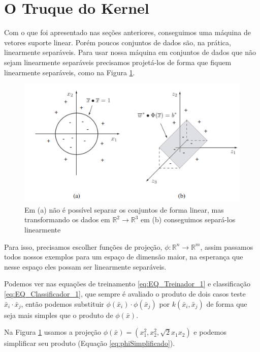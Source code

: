 \section{O Truque do Kernel}
Com o que foi apresentado nas seções anteriores, conseguimos uma máquina de vetores suporte linear. Porém poucos conjuntos de dados são, na prática, linearmente separáveis. Para usar nossa máquina em conjuntos de dados que não sejam linearmente separáveis precisamos projetá-los de forma que fiquem linearmente separáveis, como na Figura \ref{fig:LABEL_FIG_5}.

\begin{figure}
  \centering
  \includegraphics[width=1\textwidth]{imagens/svm_5.png}
  \caption{Em (a) não é possível separar os conjuntos de forma linear, mas transformando os dados em $\mathbb{R}^2\rightarrow \mathbb{R}^3$ em (b) conseguimos separá-los linearmente \cite{art:LIVRO_SVM}}
  \label{fig:LABEL_FIG_5}
\end{figure}

Para isso, precisamos escolher funções de projeção, $\phi:\mathbb{R}^n\rightarrow\mathbb{R}^m$, assim passamos todos nossos exemplos para um espaço de dimensão maior, na esperança que nesse espaço eles possam ser linearmente separáveis.

Podemos ver nas equações de treinamento \ref{eq:EQ_Treinador_1} e classificação \ref{eq:EQ_Classificador_1}, que sempre é avaliado o produto de dois casos teste $\bar{x}_i\cdot\bar{x}_j$, então podemos substituir $\phi(\bar{x}_i) \cdot \phi ( \bar{x}_j )$ por $k(\bar{x}_i,\bar{x}_j)$ de forma que   seja mais simples que o produto de $\phi(\bar{x})$.

Na Figura \ref{fig:LABEL_FIG_5} usamos a projeção $\phi(\bar{x})=(x_1^2,x_2^2,\sqrt{2}x_1x_2)$ e podemos simplificar seu produto (Equação \ref{eq:phiSimplificado}).

